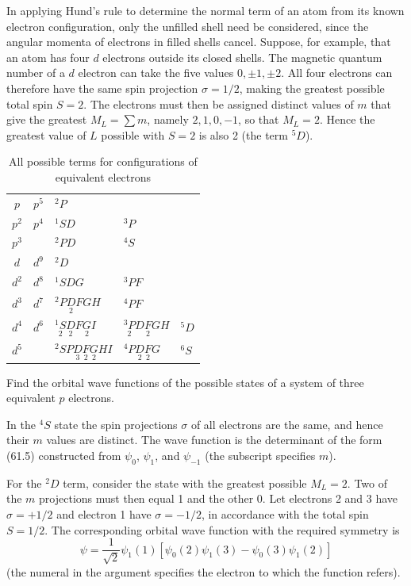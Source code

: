 In applying Hund's rule to determine the normal term of an atom from its known electron configuration, only the unfilled shell need be considered, since the angular momenta of electrons in filled shells cancel. Suppose, for example, that an atom has four $d$ electrons outside its closed shells. The magnetic quantum number of a $d$ electron can take the five values $0,\pm1,\pm2$. All four electrons can therefore have the same spin projection $\sigma=1/2$, making the greatest possible total spin $S=2$. The electrons must then be assigned distinct values of $m$ that give the greatest $M_L=\sum m$, namely $2,1,0,-1$, so that $M_L=2$. Hence the greatest value of $L$ possible with $S=2$ is also 2 (the term ${}^5D$).

\begin{table}[ht]
\centering
\caption{All possible terms for configurations of equivalent electrons}
\begin{tabular}{c@{,\quad}c|lll}
$p$&$p^5$&${}^2P$&&\\
$p^2$&$p^4$&${}^1SD$&${}^3P$&\\
$p^3$&&${}^2PD$&${}^4S$&\\ \hline
$d$&$d^9$&${}^2D$&&\\
$d^2$&$d^8$&${}^1SDG$&${}^3PF$&\\
$d^3$&$d^7$&${}^2P\underset{2}{D}FGH$&${}^4PF$&\\
$d^4$&$d^6$&$\underset{2}{{}^1S}\underset{2}{D}F\underset{2}{G}I$
&$\underset{2}{{}^3P}D\underset{2}{F}GH$&${}^5D$\\
$d^5$&&${}^2SP\underset{3}{D}\underset{2}{F}\underset{2}{G}HI$
&${}^4P\underset{2}{D}\underset{2}{F}G$&${}^6S$
\end{tabular}
\end{table}

\ProblemHeading Find the orbital wave functions of the possible states of a system of three equivalent $p$ electrons.

\SolutionHeading In the ${}^4S$ state the spin projections $\sigma$ of all electrons are the same, and hence their $m$ values are distinct. The wave function is the determinant of the form (61.5) constructed from $\psi_0$, $\psi_1$, and $\psi_{-1}$ (the subscript specifies $m$).

For the ${}^2D$ term, consider the state with the greatest possible $M_L=2$. Two of the $m$ projections must then equal 1 and the other 0. Let electrons 2 and 3 have $\sigma=+1/2$ and electron 1 have $\sigma=-1/2$, in accordance with the total spin $S=1/2$. The corresponding orbital wave function with the required symmetry is
\[
\psi=\frac1{\sqrt2}\psi_1(1)
[\psi_0(2)\psi_1(3)-\psi_0(3)\psi_1(2)]
\]
(the numeral in the argument specifies the electron to which the function refers).

